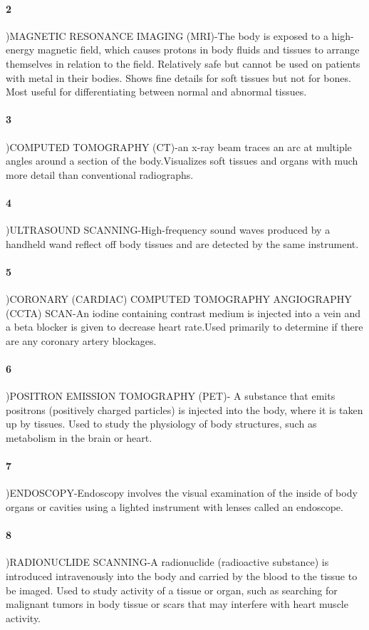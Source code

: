 \documentclass[11pt]{article}
\begin{document}
\paragraph{2})MAGNETIC RESONANCE IMAGING (MRI)-The body is exposed to a high-energy magnetic field, which
causes protons
in body fluids and tissues to arrange themselves in relation to the field.
Relatively safe but cannot be used on patients with metal
in their bodies. Shows fine details for soft tissues but not for bones.
Most useful for differentiating between normal and abnormal tissues.
\paragraph{3})COMPUTED TOMOGRAPHY (CT)-an x-ray
beam traces an arc at multiple angles around a section of the body.Visualizes soft tissues and organs with much more detail
than conventional radiographs. 
\paragraph{4})ULTRASOUND SCANNING-High-frequency sound waves produced by a handheld wand reflect
off body tissues and are detected by the same instrument.
\paragraph{5})CORONARY (CARDIAC) COMPUTED TOMOGRAPHY
ANGIOGRAPHY (CCTA) SCAN-An iodine containing
contrast medium is injected into a vein and a beta blocker is
given to decrease heart rate.Used primarily to determine if there are any coronary artery blockages.
\paragraph{6})POSITRON EMISSION TOMOGRAPHY (PET)-
A substance that emits positrons (positively charged particles)
is injected into the body, where it is taken up by tissues. Used to study the physiology of body structures, such as
metabolism in the brain or heart.
\paragraph{7})ENDOSCOPY-Endoscopy involves the visual examination of the inside of body
organs or cavities using a lighted instrument with lenses called an endoscope.
\paragraph{8})RADIONUCLIDE SCANNING-A radionuclide (radioactive substance) is
introduced intravenously into the body and carried by the
blood to the tissue to be imaged. Used to study activity of a tissue or organ, such
as searching for malignant tumors in body tissue or scars that
may interfere with heart muscle activity.
\end{document}
